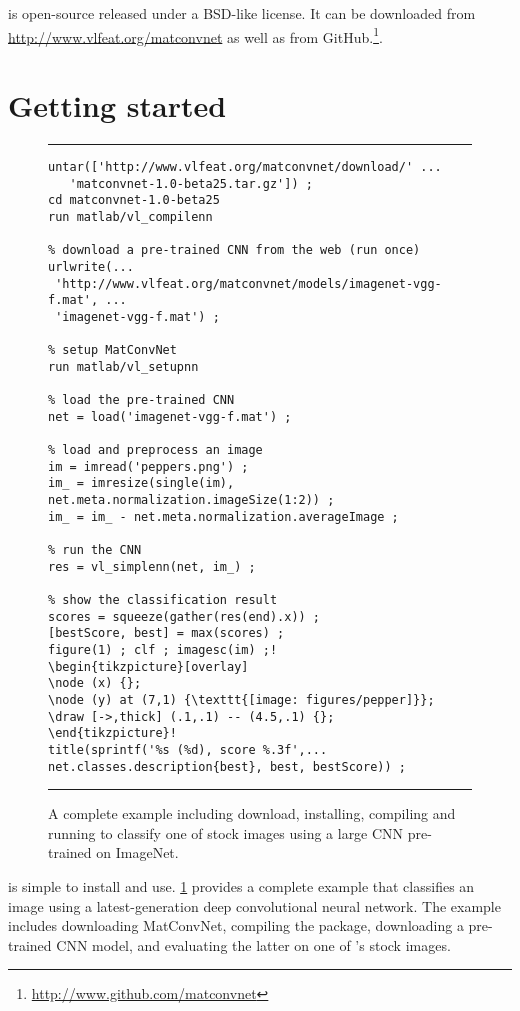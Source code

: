 \matconvnet is open-source released under a BSD-like license. It can be downloaded from \url{http://www.vlfeat.org/matconvnet} as well as from GitHub.\footnote{\small\url{http://www.github.com/matconvnet}}.

\section{Getting started}\label{s:getting-statrted}

\begin{figure}
\hrule
\begin{lstlisting}[escapechar=!]
% install and compile MatConvNet (run once)
untar(['http://www.vlfeat.org/matconvnet/download/' ...
   'matconvnet-1.0-beta25.tar.gz']) ;
cd matconvnet-1.0-beta25
run matlab/vl_compilenn

% download a pre-trained CNN from the web (run once)
urlwrite(...
 'http://www.vlfeat.org/matconvnet/models/imagenet-vgg-f.mat', ...
 'imagenet-vgg-f.mat') ;

% setup MatConvNet
run matlab/vl_setupnn

% load the pre-trained CNN
net = load('imagenet-vgg-f.mat') ;

% load and preprocess an image
im = imread('peppers.png') ;
im_ = imresize(single(im), net.meta.normalization.imageSize(1:2)) ;
im_ = im_ - net.meta.normalization.averageImage ;

% run the CNN
res = vl_simplenn(net, im_) ;

% show the classification result
scores = squeeze(gather(res(end).x)) ;
[bestScore, best] = max(scores) ;
figure(1) ; clf ; imagesc(im) ;!
\begin{tikzpicture}[overlay]
\node (x) {};
\node (y) at (7,1) {\texttt{[image: figures/pepper]}};
\draw [->,thick] (.1,.1) -- (4.5,.1) {};
\end{tikzpicture}!
title(sprintf('%s (%d), score %.3f',...
net.classes.description{best}, best, bestScore)) ;
\end{lstlisting}
\hrule
\caption{A complete example including download, installing, compiling and running  \matconvnet to classify one of  \matlab stock images using a large CNN pre-trained on ImageNet.}
\label{f:demo}
\end{figure}

\matconvnet is simple to install and use. \cref{f:demo} provides a complete example that classifies an image using a latest-generation deep convolutional neural network. The example includes downloading MatConvNet, compiling the package, downloading a pre-trained CNN model, and evaluating the latter on one of \matlab's stock images.

